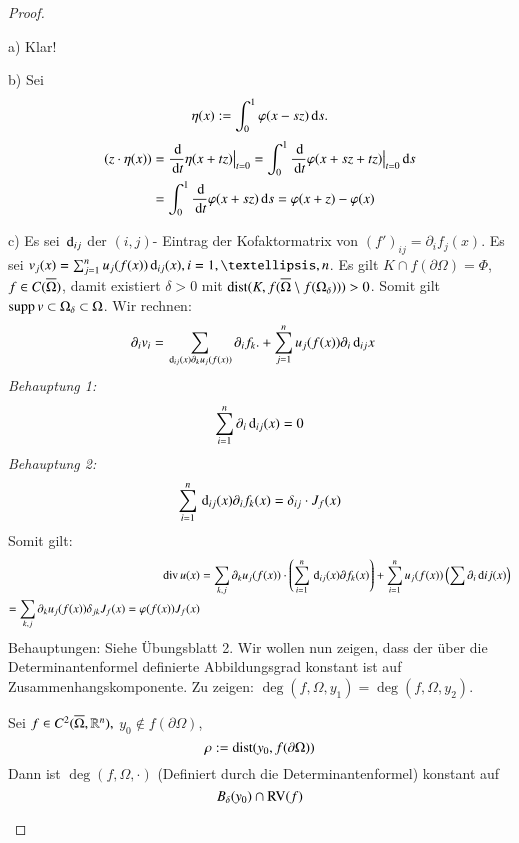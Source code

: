 \begin{proof}
    \begin{description}
    \item{a)}
    Klar!
    \item{b)}
    Sei
    \[
        \eta (x):= \int_0^1 \varphi (x-sz) \, \mathrm{d} s.
    \]
    \begin{align*}
        (z\cdot \eta(x))&=\frac{\, \mathrm{d}}{\, \mathrm{d} t } \eta (x+tz)\big|_{t=0}=\int_0^1 \frac{\, \mathrm{d}}{\, \mathrm{d} t} \varphi(x+sz+tz)
       \big|_{t=0} \, \mathrm{d} s\\
        &= \int_0^1 \frac{\, \mathrm{d}}{\, \mathrm{d} t} \varphi(x+sz)\, \mathrm{d} s=\varphi(x+z)-\varphi(x)
    \end{align*}
    \item{c)}
    Es sei $\, \mathrm{d} _{ij}$ der $(i,j)$- Eintrag der Kofaktormatrix von $(f')_{ij}= \partial _if_j(x)$.
    Es sei $v_j(x)=\sum_{j=1}^n u_j(f(x))\d _{ij}(x),i=1,…,n$. Es gilt $K\cap f(\partial \Omega) = \Phi$,
    $f\in C(\overline \Omega)$, damit existiert $\delta>0$ mit $\mathrm{dist}(K,f(\overline \Omega \setminus 
                f(\Omega_\delta)))>0$.
    Somit gilt $\mathrm{supp}\, v\subset \Omega_\delta\subset \Omega$.
    Wir rechnen:
    \begin{align*}
        \partial_iv_i&= \sum_{\, \mathrm{d} _{ij}(x)\partial_ku_j(f(x))}\partial _i f_k.+\sum_{j=1}^nu_j(f(x))
        \partial_i \, \mathrm{d}_{ij}x
    \end{align*}
    \textit{Behauptung 1:}
    \[
        \sum_{i=1}^n \partial_i\, \mathrm{d}_{ij}(x)=0
    \]
    \textit{Behauptung 2:}
    \[
        \sum_{i=1}^n \, \mathrm{d}_{ij} (x) \partial_if_k(x) =\delta_{ij}\cdot J_f(x)
    \]
    Somit gilt:
    \begin{align*}
        \mathrm{div}\, u(x)&=\sum_{k,j}\partial _k u_j(f(x))\cdot \left( \sum_{i=1}^n \, \mathrm{d}_{ij}(x) \partial f_k(x) 
                \right) +\sum_{i=1}^nu_j(f(x)) \left( \sum \partial _i \, \mathrm{d} {ij}(x) \right)\\
        =\sum_{k,j}\partial _k u_j(f(x))\delta _{jk} J_f(x)=\varphi(f(x))J_f(x)
    \end{align*}
    Behauptungen: Siehe Übungsblatt 2.
    Wir wollen nun zeigen, dass der über die Determinantenformel definierte Abbildungsgrad konstant
    ist auf Zusammenhangskomponente. Zu zeigen: $\deg(f,\Omega,y_1)=\deg(f,\Omega,y_2)$.

    \begin{lem}\label{2.8}
        Sei $f\in C^2(\overline \Omega,\mathbb{R}^n),$ $ y_0\nin f(\partial \Omega) $,
        \[
            \rho:=\mathrm{dist}(y_0,f(\partial \Omega))
        \]
        Dann ist $\deg(f,\Omega,\cdot)$ (Definiert durch die Determinantenformel) konstant auf
        \[
            B_\delta (y_0)\cap \mathrm{RV}(f)
        \]
    \end{lem}


\end{description}
\end{proof}
